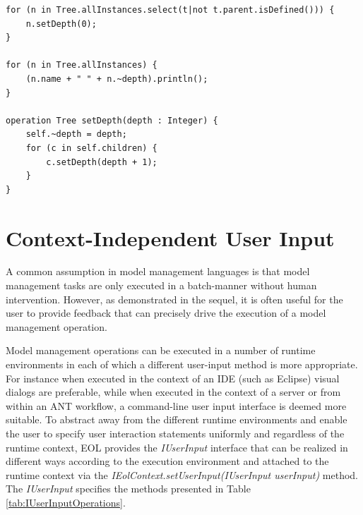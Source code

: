 \begin{lstlisting}[float=tbp, caption=A simplified version of Listing \ref{lst:NoExtendedProperties} using extended properties, label=lst:ExtendedProperties, language=EOL]
for (n in Tree.allInstances.select(t|not t.parent.isDefined())) {
	n.setDepth(0);
}

for (n in Tree.allInstances) {
	(n.name + " " + n.~depth).println();
}

operation Tree setDepth(depth : Integer) {
	self.~depth = depth;
	for (c in self.children) {
		c.setDepth(depth + 1);
	}
}
\end{lstlisting}


\section{Context-Independent User Input}
\label{sec:Design.EOL.UserInput}

A common assumption in model management languages is that model management tasks are only executed in a batch-manner without human intervention. However, as demonstrated in the sequel, it is often useful for the user to provide feedback that can precisely drive the execution of a model management operation.

Model management operations can be executed in a number of runtime environments in each of which a different user-input method is more appropriate. For instance when executed in the context of an IDE (such as Eclipse) visual dialogs are preferable, while when executed in the context of a server or from within an ANT workflow, a command-line user input interface is deemed more suitable. To abstract away from the different runtime environments and enable the user to specify user interaction statements uniformly and regardless of the runtime context, EOL provides the \emph{IUserInput} interface that can be realized in different ways according to the execution environment and attached to the runtime context via the \emph{IEolContext.setUserInput(IUserInput userInput)} method. The \emph{IUserInput} specifies the methods presented in Table \ref{tab:IUserInputOperations}.

